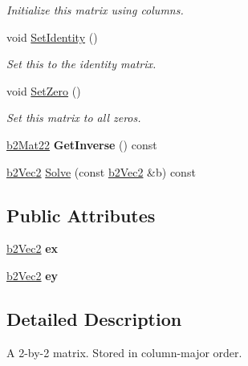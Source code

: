 \begin{DoxyCompactItemize}
\begin{DoxyCompactList}\small\item\em Initialize this matrix using columns. \end{DoxyCompactList}\item 
\mbox{\label{structb2Mat22_a7192f063b771ac9ded060e41df890509}} 
void \mbox{\hyperlink{structb2Mat22_a7192f063b771ac9ded060e41df890509}{Set\+Identity}} ()
\begin{DoxyCompactList}\small\item\em Set this to the identity matrix. \end{DoxyCompactList}\item 
\mbox{\label{structb2Mat22_aaeae95f61cf3171ffb94703980e3594b}} 
void \mbox{\hyperlink{structb2Mat22_aaeae95f61cf3171ffb94703980e3594b}{Set\+Zero}} ()
\begin{DoxyCompactList}\small\item\em Set this matrix to all zeros. \end{DoxyCompactList}\item 
\mbox{\label{structb2Mat22_ad0b0676deea081b761c67be48e0ac850}} 
\mbox{\hyperlink{structb2Mat22}{b2\+Mat22}} {\bfseries Get\+Inverse} () const
\item 
\mbox{\hyperlink{structb2Vec2}{b2\+Vec2}} \mbox{\hyperlink{structb2Mat22_a3313c8d135c01fbf74e7fea31f1ea4c1}{Solve}} (const \mbox{\hyperlink{structb2Vec2}{b2\+Vec2}} \&b) const
\end{DoxyCompactItemize}
\subsection*{Public Attributes}
\begin{DoxyCompactItemize}
\item 
\mbox{\label{structb2Mat22_abaffa5fc1d401ea36415acffa6205689}} 
\mbox{\hyperlink{structb2Vec2}{b2\+Vec2}} {\bfseries ex}
\item 
\mbox{\label{structb2Mat22_af19db58941d2cd146325ef3191b776fd}} 
\mbox{\hyperlink{structb2Vec2}{b2\+Vec2}} {\bfseries ey}
\end{DoxyCompactItemize}


\subsection{Detailed Description}
A 2-\/by-\/2 matrix. Stored in column-\/major order. 


